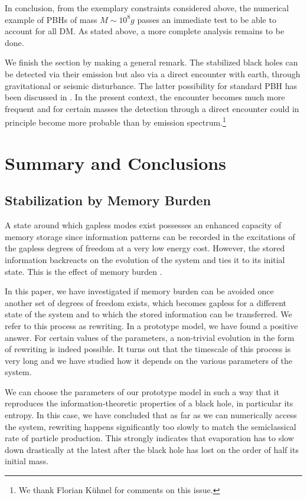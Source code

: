 \documentclass[aps,prd,reprint,superscriptaddress,nofootinbib]{revtex4-2}
\begin{document}
In conclusion, from the exemplary constraints considered above, the numerical example of PBHs of mass $M \sim 10^8 g$ 
 passes an immediate test to be able to account for all DM. 
As stated above, a more complete analysis remains to be done.
 
 We finish the section by making a general remark. The stabilized black holes can be detected via their emission but also via a direct encounter with earth, through gravitational or seismic disturbance.  The latter possibility for standard PBH has been discussed in \cite{1203.3806}. In the present context, the encounter becomes much more frequent and for certain masses the detection through a direct encounter could in principle become 
more probable than by emission spectrum.\footnote{We thank Florian K\"uhnel for comments on this issue.}
 



\section{Summary and Conclusions}
\label{sec:outlook}	

\subsection{Stabilization by Memory Burden}
A state around which gapless modes exist possesses an enhanced capacity of memory storage since information patterns can be recorded in the excitations of the gapless degrees of freedom at a very low energy cost. However, the stored information backreacts on the evolution of the system and ties it to its initial state. This is the effect of memory burden \cite{1810.02336}.

In this paper, we have investigated if memory burden can be avoided once another set of degrees of freedom exists, which becomes gapless for a different state of the system and to which the stored information can be transferred. We refer to this process as rewriting. In a prototype model, we 
have found a positive answer. For certain values of the parameters, a non-trivial evolution in the form of rewriting is indeed possible. It turns out that the timescale of this process is very long and we have studied how it depends on the various parameters of the system.

We can choose the parameters of our prototype model in such a way that it 
reproduces the information-theoretic properties of a black hole, in particular its entropy. In this case, we have concluded that as far as we can numerically access the system, rewriting happens significantly too slowly 
to match the semiclassical rate of particle production. 
This strongly indicates that evaporation has to slow down drastically at the latest after the black hole has lost on the order of half its initial 
mass.
\end{document}
